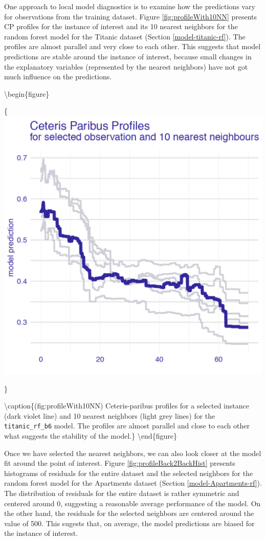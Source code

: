 \documentclass[12pt,]{krantz}
\begin{document}
One approach to local model diagnostics is to examine how the predictions vary for observations from the training dataset. Figure \ref{fig:profileWith10NN} presents CP profiles for the instance of interest and its 10 nearest neighbors for the random forest model for the Titanic dataset (Section \ref{model-titanic-rf}). The profiles are almost parallel and very close to each other. This suggests that model predictions are stable around the instance of interest, because small changes in the explanatory variables (represented by the nearest neighbors) have not got much influence on the predictions.

\textbackslash{}begin\{figure\}

\{\centering \includegraphics[width=0.5\linewidth]{figure/example_cp}

\}

\textbackslash{}caption\{(fig:profileWith10NN) Ceteris-paribus profiles for a selected instance (dark violet line) and 10 nearest neighbors (light grey lines) for the \texttt{titanic\_rf\_b6} model. The profiles are almost parallel and close to each other what suggests the stability of the model.\}\label{fig:profileWith10NN}
\textbackslash{}end\{figure\}

Once we have selected the nearest neighbors, we can also look closer at the model fit around the point of interest.
Figure \ref{fig:profileBack2BackHist} presents histograms of residuals for the entire dataset and the selected neighbors for the random forest model for the Apartments dataset (Section \ref{model-Apartments-rf}). The distribution of residuals for the entire dataset is rather symmetric and centered around 0, suggesting a reasonable average performance of the model. On the other hand, the residuals for the selected neighbors are centered around the value of 500. This sugests that, on average, the model predictions are biased for the instance of interest.
\end{document}
